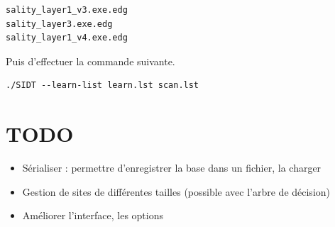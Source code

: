 \documentclass[a4paper,10pt]{article}
\begin{document}
\begin{verbatim}
sality_layer1_v3.exe.edg
sality_layer3.exe.edg
sality_layer1_v4.exe.edg
\end{verbatim} 

Puis d'effectuer la commande suivante.
\begin{verbatim}
./SIDT --learn-list learn.lst scan.lst
\end{verbatim}

\section{TODO}
\begin{itemize}
 \item Sérialiser : permettre d'enregistrer la base dans un fichier, la charger
 \item Gestion de sites de différentes tailles (possible avec l'arbre de décision)
 \item Améliorer l'interface, les options
\end{itemize}
\end{document}
